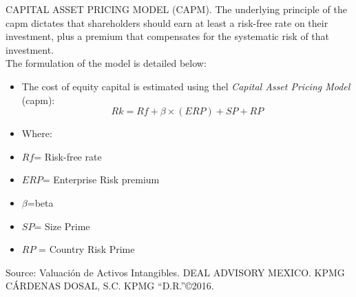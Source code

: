 \textcolor{secundario}{CAPITAL ASSET PRICING MODEL (CAPM).} The underlying principle of the \gls{capm}  dictates that shareholders should earn at least a risk-free rate on their investment, plus a premium that compensates for the systematic risk of that investment.\\[10pt]

The formulation of the model is detailed below:\vspace{10pt}

\begin{center}
\begin{minipage}{8cm}
\begin{itemize}
\small
				\item The cost of equity capital is estimated using thel \textit{Capital Asset Pricing Model} (\gls{capm}):
				$$Rk=Rf+\beta\times(ERP)+SP+RP$$
				 \item Where:
				 \item $Rf$= Risk-free rate
				 \item $ERP$= Enterprise Risk premium
				 \item $\beta$=\gls{beta}
				 \item $SP$= Size Prime
				 \item $RP$ = Country Risk Prime
			\end{itemize}
	\footnotesize{Source: Valuaci\'on de Activos Intangibles. DEAL ADVISORY MEXICO. KPMG C\'ARDENAS DOSAL, S.C. KPMG ``D.R.''\copyright 2016.}
		\end{minipage}
\end{center}


